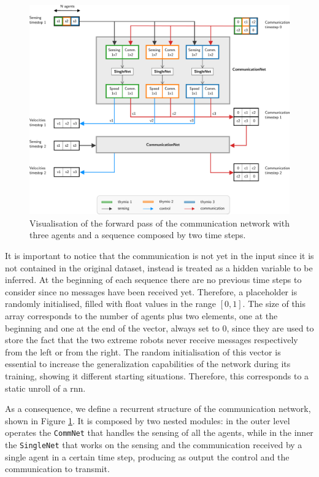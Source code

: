 \begin{figure}[!htb]
	\centering
	\includegraphics[width=\textwidth]{contents/images/commnet2}
	\caption[Communication network.]{Visualisation of the forward pass of the 
		communication network with three agents and a sequence composed by two 
		time steps.}
	\label{fig:commnet1}
\end{figure}

It is important to notice that the communication is not yet in the input since 
it is not contained in the original dataset, instead is treated as a hidden 
variable to be inferred. 
At the beginning of each sequence there are no previous time steps to 
consider since no messages have been received yet. Therefore, a placeholder 
is randomly initialised, filled with float values in the range $[0, 1]$. 
The size of this array corresponds to the number of agents plus two 
elements, one at the beginning and one at the end of the vector, always set 
to $0$, since they are used to store the fact that the two extreme robots 
never receive messages respectively from the left or from the right. 
The random initialisation of this vector is essential to increase the 
generalization capabilities of the network during its training, showing it 
different starting situations.
Therefore, this corresponds to a static unroll of a \gls{rnn}.%

As a consequence, we define a recurrent structure of the communication 
network, shown in Figure \ref{fig:commnet1}.
It is composed by two nested modules: in the outer level operates the 
\texttt{CommNet} that handles the sensing of all the agents, while in the inner the 
\texttt{SingleNet} that works on the sensing and the communication received by a 
single agent in a certain time step, producing as output the control and the 
communication to transmit. 

